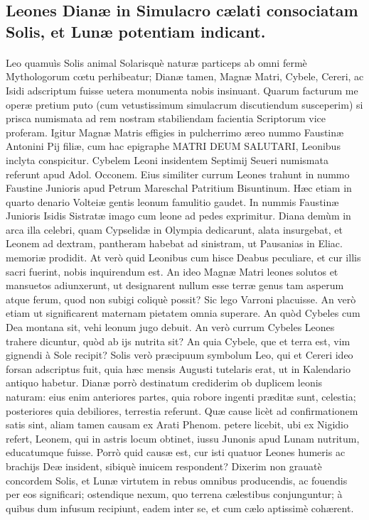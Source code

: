 \documentclass[a4paper, 11pt, oneside, polutonikogreek, latin]{article}
\begin{document}
\subsection{Leones Dianæ in Simulacro cælati consociatam Solis, et Lunæ potentiam indicant.}
\paragraph{}
Leo quamuìs Solis animal Solarisquè naturæ particeps ab omni fermè Mythologorum cœtu perhibeatur; Dianæ tamen, Magnæ Matri, Cybele, Cereri, ac Isidi adscriptum fuisse uetera monumenta nobis insinuant. Quarum facturum me operæ pretium puto (cum vetustissimum simulacrum discutiendum susceperim) si prisca numismata ad rem nostram stabiliendam facientia Scriptorum vice proferam. Igitur Magnæ Matris effigies in pulcherrimo æreo nummo Faustinæ Antonini Pij filiæ, cum hac epigraphe MATRI DEUM SALUTARI, Leonibus inclyta conspicitur. Cybelem Leoni insidentem Septimij Seueri numismata referunt apud Adol. Occonem. Eius similiter currum Leones trahunt in nummo Faustine Junioris apud Petrum Mareschal Patritium Bisuntinum. Hæc etiam in quarto denario Volteiæ gentis leonum famulitio gaudet. In nummis Faustinæ Junioris Isidis Sistratæ imago cum leone ad pedes exprimitur. Diana demùm in arca illa celebri, quam Cypselidæ in Olympia dedicarunt, alata insurgebat, et Leonem ad dextram, pantheram habebat ad sinistram, ut Pausanias in Eliac. memoriæ prodidit. At verò quid Leonibus cum hisce Deabus peculiare, et cur illis sacri fuerint, nobis inquirendum est. An ideo Magnæ Matri leones solutos et mansuetos adiunxerunt, ut designarent nullum esse terræ genus tam asperum atque ferum, quod non subigi coliquè possit? Sic lego Varroni placuisse. An verò etiam ut significarent maternam pietatem omnia superare. An quòd Cybeles cum Dea montana sit, vehi leonum jugo debuit. An verò currum Cybeles Leones trahere dicuntur, quòd ab ijs nutrita sit? An quia Cybele, que et terra est, vim gignendi à Sole recipit? Solis verò præcipuum symbolum Leo, qui et Cereri ideo forsan adscriptus fuit, quia hæc mensis Augusti tutelaris erat, ut in Kalendario antiquo habetur. Dianæ porrò destinatum crediderim ob duplicem leonis naturam: eius enim anteriores partes, quia robore ingenti præditæ sunt, celestia; posteriores quia debiliores, terrestia referunt. Quæ cause licèt ad confirmationem satis sint, aliam tamen causam ex Arati Phenom. petere licebit, ubi ex Nigidio refert, Leonem, qui in astris locum obtinet, iussu Junonis apud Lunam nutritum, educatumque fuisse. Porrò quid causæ est, cur isti quatuor Leones humeris ac brachijs Deæ insident, sibiquè inuicem respondent? Dixerim non grauatè concordem Solis, et Lunæ virtutem in rebus omnibus producendis, ac fouendis per eos significari; ostendique nexum, quo terrena cælestibus conjunguntur; à quibus dum infusum recipiunt, eadem inter se, et cum cælo aptissimè cohærent.
\clearpage
\end{document}
